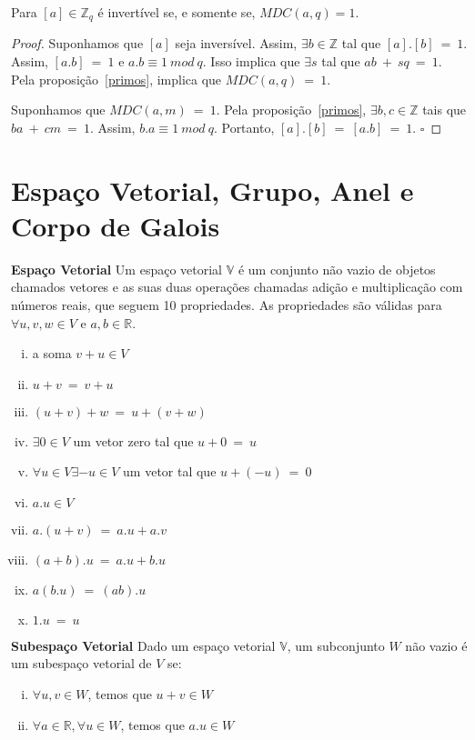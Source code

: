 \begin{proposition} \label{invertivel} Para  $[a] \in \mathbb{Z}_q$  é invertível se, e somente se, $MDC(a,q)=1$.
\end{proposition}

\begin{proof}
Suponhamos que $[a]$ seja inversível. Assim, $\exists b \in \mathbb{Z}$ tal que $[a].[b]\ =\ 1$. Assim, $[a.b]\ =\ 1$ e $a.b \equiv 1\ mod\ q$. Isso implica que $\exists s$ tal que $ab\ +\ sq\ =\ 1$. Pela proposição~\ref{primos}, implica que $MDC(a,q)\ =\ 1$.

Suponhamos que $MDC(a,m)\ =\ 1$. Pela proposição~\ref{primos}, $\exists b, c \in \mathbb{Z}$ tais que $ba\ +\ cm\ =\ 1$. Assim, $b.a \equiv 1\ mod\ q$. Portanto, $[a].[b]\ =\ [a.b]\ =\ 1$.
$\square$
\end{proof}

\section{Espaço Vetorial, Grupo, Anel e Corpo de Galois}

\begin{definition} {\bf Espaço Vetorial} \label{EspVet}  Um espaço vetorial $\mathbb{V}$ é um conjunto não vazio de objetos chamados vetores e as suas duas operações chamadas adição e multiplicação com números reais, que seguem 10 propriedades. As propriedades são válidas para $\forall u, v, w \in V$ e $a, b \in \mathbb{R}$.
   \begin{enumerate}[(i)]
      \item a soma $v + u \in V$ 
      \item $u + v\ =\ v + u$
      \item $(u + v) + w\ =\  u + (v + w)$
      \item $\exists 0 \in V$ um vetor zero tal que $u + 0\ =\ u$
      \item $\forall u \in V \exists -u \in V$ um vetor tal que $u + (-u)\ =\ 0$
      \item $a.u \in V$
      \item $a.(u + v)\ =\ a.u + a.v$
      \item $(a+b).u\ =\ a.u + b.u$
      \item $a(b.u)\ =\ (ab).u$
      \item $1.u\ =\ u$
   \end{enumerate}
\end{definition}

\begin{definition} {\bf Subespaço Vetorial} \label{SubEspVet}  Dado um espaço vetorial $\mathbb{V}$, um subconjunto $W$ não vazio é um subespaço vetorial de $V$ se:
   \begin{enumerate}[(i)]
      \item $\forall u,v \in W$, temos que $u + v \in W$
      \item $\forall a \in \mathbb{R}, \forall u \in W$, temos que $a.u \in W$
   \end{enumerate}
\end{definition}

